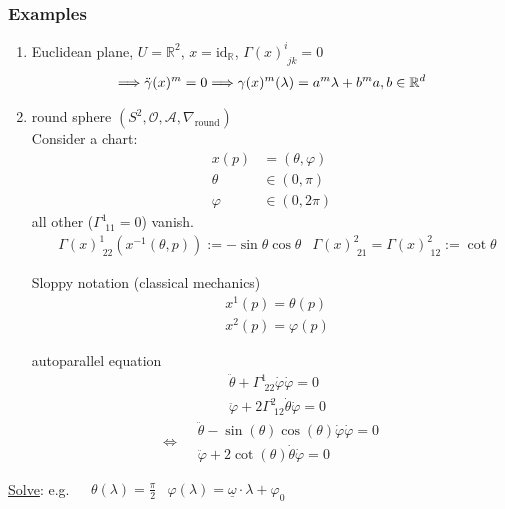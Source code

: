 \subsubsection*{Examples}
\begin{enumerate}
	\item[(a)] Euclidean plane, $U = \mathbb{R}^2$, $x= \text{id}_{\mathbb{R}}$, $\Gamma(x)^i_{\,\,jk} =0$
	\[
	\Longrightarrow \ddot{\gamma}(x)^m = 0 \Longrightarrow \gamma(x)^m(\lambda) = a^m \lambda + b^m \\
	a,b \in \mathbb{R}^d
	\]
	\item[(b)] round sphere $(S^2, \mathcal{O}, \mathcal{A}, \nabla_{\text{round}})$ \\
	Consider a chart: 
	\[
	\begin{aligned}
	x(p) & = (\theta, \varphi) \\
	\theta & \in (0, \pi) \\
	\varphi & \in (0, 2\pi)
	\end{aligned}	
	\]
	all other ($\Gamma^1_{\,\, 11} = 0$) vanish.
	\[
	\begin{aligned} 
		& \Gamma(x)^1_{\,\, 22} (x^{-1}(\theta, p)) := - \sin{\theta} \cos{\theta} 
		& \Gamma(x)^2_{\,\, 21} = \Gamma(x)^2_{\,\,12} := \cot{\theta}  
		\end{aligned} 
	\]

Sloppy notation (classical mechanics) \\
\[
\begin{aligned}
& x^1(p) = \theta(p) \\ 
& x^2(p) = \varphi(p)
\end{aligned}
\]
	
autoparallel equation
\[
\begin{aligned} 
& \ddot{\theta} + \Gamma^1_{\,\, 22} \dot{\varphi} \dot{\varphi} = 0 \\ 
& \ddot{\varphi} + 2 \Gamma^2_{\,\, 12} \dot{\theta}\dot{\varphi } = 0 
\end{aligned} 
\]
\[
\Longleftrightarrow \boxed{ 
	\begin{aligned}
	& \ddot{\theta} - \sin{(\theta)} \cos{(\theta)} \dot{\varphi} \dot{\varphi} = 0 \\ 
	& \ddot{\varphi} + 2\cot{(\theta)} \dot{\theta} \dot{\varphi} = 0 
	\end{aligned} }
\]
\end{enumerate}

\underline{Solve}: e.g. $\begin{aligned} 
& \theta(\lambda) = \frac{\pi}{2}
& \varphi(\lambda) = \underline{\omega} \cdot \lambda + \varphi_0 
\end{aligned} $
	
